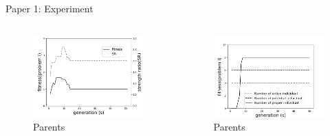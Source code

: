 \documentclass{beamer}
\begin{document}
\begin{frame}{Paper 1: Experiment}
    \begin{columns}[c]
    \begin{column}{0.5\textwidth}
		\begin{figure}
			\includegraphics[scale=0.4]{fig/chapter4_first_result_strength_ratio_and_fitness.png}
			\caption{Parents}
		\end{figure}
    \end{column}
	\begin{column}{0.5\textwidth}
		\begin{figure}
			\includegraphics[scale=0.4]{fig/chapter4_first_result_number_of_three_groups.png}
			\caption{Parents}
		\end{figure}
	\end{column}
\end{columns}
\end{frame}
\end{document}
